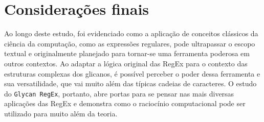 \chapter{Considerações finais}

Ao longo deste estudo, foi evidenciado como a aplicação de conceitos clássicos
da ciência da computação, como as expressões regulares, pode ultrapassar o
escopo textual e originalmente planejado para tornar-se uma ferramenta poderosa
em outros contextos. Ao adaptar a lógica original das RegEx para o contexto das
estruturas complexas dos glicanos, é possível perceber o poder dessa ferramenta
e sua versatilidade, que vai muito além das típicas cadeias de caracteres. O
estudo do \texttt{Glycan RegEx}, portanto, abre portas para se pensar nas mais
diversas aplicações das RegEx e demonstra como o raciocínio computacional pode
ser utilizado para muito além da teoria.